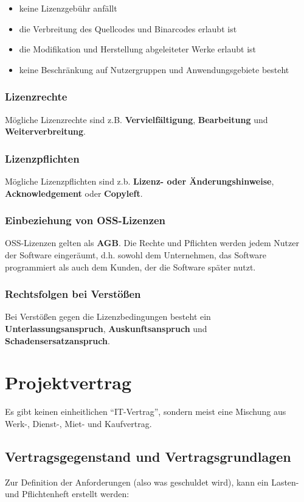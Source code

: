 \documentclass[12pt,A4]{extarticle}
\begin{document}
\begin{itemize}
  \item{keine Lizenzgebühr anfällt}
  \item{die Verbreitung des Quellcodes und Binarcodes erlaubt ist}
  \item{die Modifikation und Herstellung abgeleiteter Werke erlaubt ist}
  \item{keine Beschränkung auf Nutzergruppen und Anwendungsgebiete besteht}
\end{itemize}

\subsubsection{Lizenzrechte}
Mögliche Lizenzrechte sind z.B. \textbf{Vervielfältigung}, \textbf{Bearbeitung} und \textbf{Weiterverbreitung}.

\subsubsection{Lizenzpflichten}
Mögliche Lizenzpflichten sind z.b. \textbf{Lizenz- oder Änderungshinweise}, \textbf{Acknowledgement} oder \textbf{Copyleft}.

\subsubsection{Einbeziehung von OSS-Lizenzen}
OSS-Lizenzen gelten als \textbf{AGB}. Die Rechte und Pflichten werden jedem Nutzer der Software eingeräumt, d.h. sowohl dem Unternehmen, das Software programmiert als auch dem Kunden, der die Software später nutzt.

\subsubsection{Rechtsfolgen bei Verstößen}
Bei Verstößen gegen die Lizenzbedingungen besteht ein \textbf{Unterlassungsanspruch}, \textbf{Auskunftsanspruch} und \textbf{Schadensersatzanspruch}.

\section{Projektvertrag}
Es gibt keinen einheitlichen ``IT-Vertrag'', sondern meist eine Mischung aus Werk-, Dienst-, Miet- und Kaufvertrag.

\subsection{Vertragsgegenstand und Vertragsgrundlagen}
Zur Definition der Anforderungen (also was geschuldet wird), kann ein Lasten- und Pflichtenheft erstellt werden:
\end{document}
